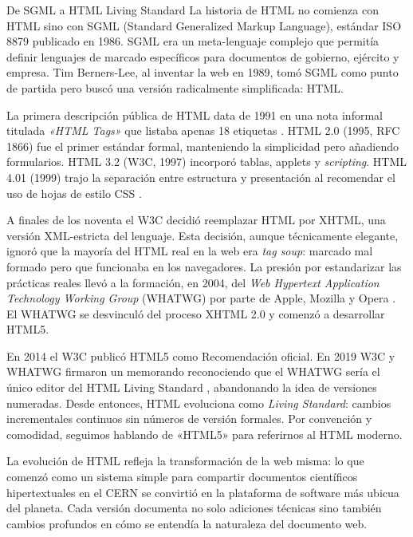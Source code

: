 \documentclass[11pt,a4paper,openany]{book}
\begin{document}
\begin{cajahistoria}{De SGML a HTML Living Standard}
La historia de HTML no comienza con HTML sino con SGML (Standard
Generalized Markup Language), estándar ISO 8879 publicado en 1986.
SGML era un meta-lenguaje complejo que permitía definir lenguajes de
marcado específicos para documentos de gobierno, ejército y empresa.
Tim Berners-Lee, al inventar la web en 1989, tomó SGML como punto de
partida pero buscó una versión radicalmente simplificada: HTML.

La primera descripción pública de HTML data de 1991 en una nota
informal titulada \emph{«HTML Tags»} que listaba apenas 18 etiquetas
\cite{bernerslee1991htmltags}. HTML 2.0 (1995, RFC 1866) fue el
primer estándar formal, manteniendo la simplicidad pero añadiendo
formularios. HTML 3.2 (W3C, 1997) incorporó tablas, applets y
\emph{scripting}. HTML 4.01 (1999) trajo la separación entre
estructura y presentación al recomendar el uso de hojas de estilo
CSS \cite{raggett1999html401}.

A finales de los noventa el W3C decidió reemplazar HTML por XHTML,
una versión XML-estricta del lenguaje. Esta decisión, aunque
técnicamente elegante, ignoró que la mayoría del HTML real en la web
era \emph{tag soup}: marcado mal formado pero que funcionaba en los
navegadores. La presión por estandarizar las prácticas reales llevó a
la formación, en 2004, del \emph{Web Hypertext Application Technology
Working Group} (WHATWG) por parte de Apple, Mozilla y Opera
\cite{hickson2004whatwg}. El WHATWG se desvinculó del proceso XHTML
2.0 y comenzó a desarrollar HTML5.

En 2014 el W3C publicó HTML5 como Recomendación oficial. En 2019
W3C y WHATWG firmaron un memorando reconociendo que el WHATWG sería
el único editor del HTML Living Standard
\cite{whatwgw3c2019memorandum}, abandonando la idea de versiones
numeradas. Desde entonces, HTML evoluciona como \emph{Living
Standard}: cambios incrementales continuos sin números de versión
formales. Por convención y comodidad, seguimos hablando de «HTML5»
para referirnos al HTML moderno.
\end{cajahistoria}

La evolución de HTML refleja la transformación de la web misma: lo
que comenzó como un sistema simple para compartir documentos
científicos hipertextuales en el CERN se convirtió en la plataforma
de software más ubicua del planeta. Cada versión documenta no solo
adiciones técnicas sino también cambios profundos en cómo se entendía
la naturaleza del documento web.
\end{document}
